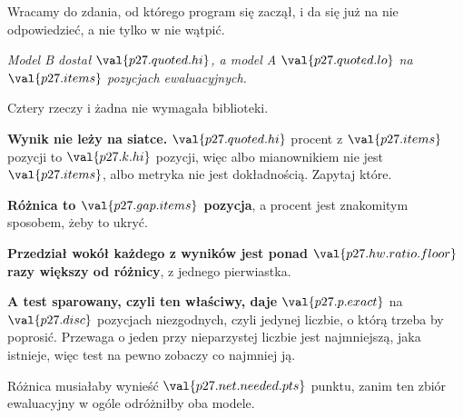 \begin{fr}
Wracamy do zdania, od którego program się zaczął, i da się już na nie
odpowiedzieć, a nie tylko w nie wątpić.

\begin{center}
\emph{Model B dostał $\val{p27.quoted.hi}$, a model A
$\val{p27.quoted.lo}$ na $\val{p27.items}$ pozycjach ewaluacyjnych.}
\end{center}

Cztery rzeczy i żadna nie wymagała biblioteki.

\textbf{Wynik nie leży na siatce.} $\val{p27.quoted.hi}$ procent z
$\val{p27.items}$ pozycji to $\val{p27.k.hi}$ pozycji, więc albo mianownikiem
nie jest $\val{p27.items}$, albo metryka nie jest dokładnością. Zapytaj które.

\textbf{Różnica to $\val{p27.gap.items}$ pozycja}, a procent jest znakomitym
sposobem, żeby to ukryć.

\textbf{Przedział wokół każdego z wyników jest ponad
$\val{p27.hw.ratio.floor}$ razy większy od różnicy}, z jednego pierwiastka.

\textbf{A test sparowany, czyli ten właściwy, daje
$\val{p27.p.exact}$} \dash{} na $\val{p27.disc}$ pozycjach niezgodnych, czyli
jedynej liczbie, o którą trzeba by poprosić. Przewaga o jeden przy
nieparzystej liczbie jest najmniejszą, jaka istnieje, więc test na pewno
zobaczy co najmniej ją.

Różnica musiałaby wynieść $\val{p27.net.needed.pts}$ punktu, zanim ten zbiór
ewaluacyjny w ogóle odróżniłby oba modele.
\end{fr}

